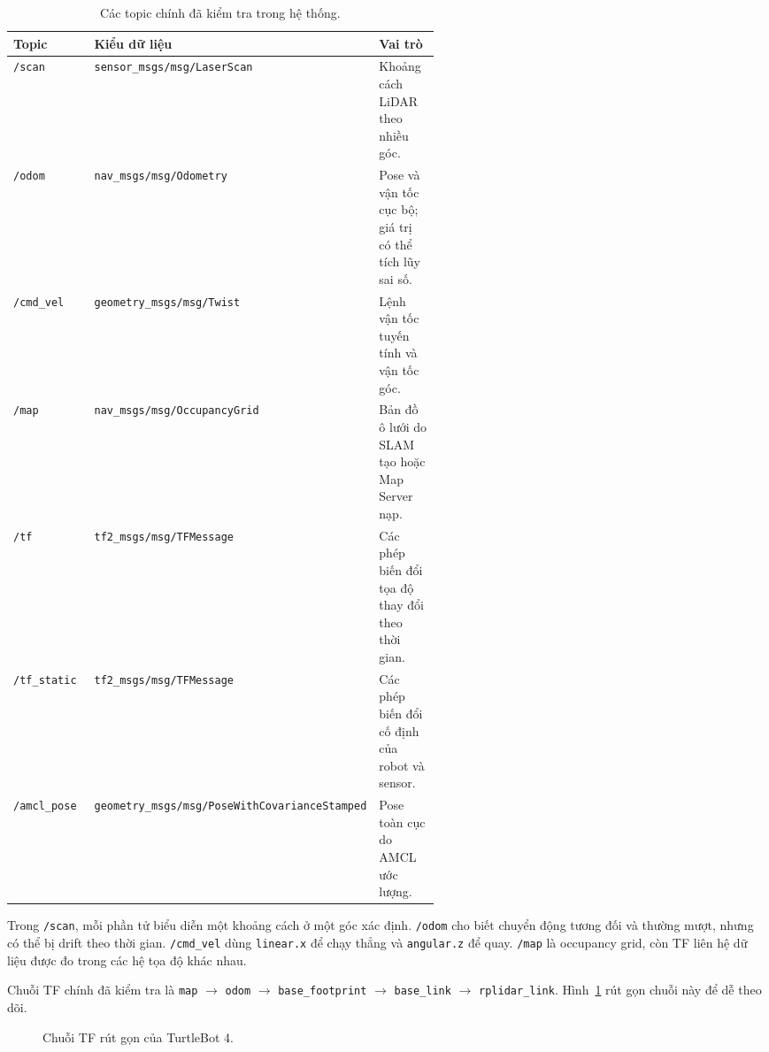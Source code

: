\documentclass[12pt,a4paper]{article}
\begin{document}
\begin{table}[htbp]
  \centering
  \caption{Các topic chính đã kiểm tra trong hệ thống.}
  \label{tab:topics}
  \small
  \renewcommand{\arraystretch}{1.15}
  \begin{tabularx}{\linewidth}{@{}p{0.19\linewidth}p{0.37\linewidth}X@{}}
    \toprule
    \textbf{Topic} & \textbf{Kiểu dữ liệu} & \textbf{Vai trò} \\
    \midrule
    \texttt{/scan} & \texttt{sensor\_msgs/msg/LaserScan} & Khoảng cách LiDAR theo nhiều góc. \\
    \texttt{/odom} & \texttt{nav\_msgs/msg/Odometry} & Pose và vận tốc cục bộ; giá trị có thể tích lũy sai số. \\
    \texttt{/cmd\_vel} & \texttt{geometry\_msgs/msg/Twist} & Lệnh vận tốc tuyến tính và vận tốc góc. \\
    \texttt{/map} & \texttt{nav\_msgs/msg/OccupancyGrid} & Bản đồ ô lưới do SLAM tạo hoặc Map Server nạp. \\
    \texttt{/tf} & \texttt{tf2\_msgs/msg/TFMessage} & Các phép biến đổi tọa độ thay đổi theo thời gian. \\
    \texttt{/tf\_static} & \texttt{tf2\_msgs/msg/TFMessage} & Các phép biến đổi cố định của robot và sensor. \\
    \texttt{/amcl\_pose} & \texttt{geometry\_msgs/msg/PoseWithCovarianceStamped} & Pose toàn cục do AMCL ước lượng. \\
    \bottomrule
  \end{tabularx}
\end{table}

Trong \texttt{/scan}, mỗi phần tử biểu diễn một khoảng cách ở một góc xác định.
\texttt{/odom} cho biết chuyển động tương đối và thường mượt, nhưng có thể bị
drift theo thời gian. \texttt{/cmd\_vel} dùng \texttt{linear.x} để chạy thẳng
và \texttt{angular.z} để quay. \texttt{/map} là occupancy grid, còn TF liên hệ
dữ liệu được đo trong các hệ tọa độ khác nhau.

Chuỗi TF chính đã kiểm tra là
\texttt{map} $\rightarrow$ \texttt{odom} $\rightarrow$
\texttt{base\_footprint} $\rightarrow$ \texttt{base\_link} $\rightarrow$
\texttt{rplidar\_link}. Hình~\ref{fig:tf-tree} rút gọn chuỗi này để dễ theo
dõi.

\begin{figure}[htbp]
  \centering
  \caption{Chuỗi TF rút gọn của TurtleBot 4.}
  \label{fig:tf-tree}
\end{figure}
\end{document}
